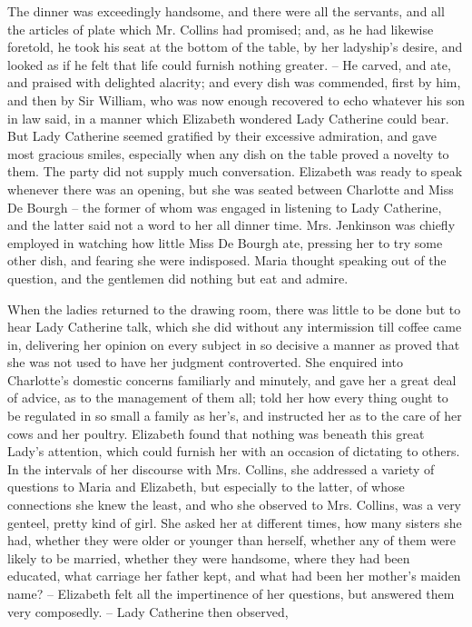 The dinner was exceedingly handsome, and there were
all the servants, and all the articles of plate which Mr.
Collins had promised; and, as he had likewise foretold,
he took his seat at the bottom of the table, by her ladyship’s
desire, and looked as if he felt that life could furnish
nothing greater. -- He carved, and ate, and praised with
delighted alacrity; and every dish was commended, first
by him, and then by Sir William, who was now enough
recovered to echo whatever his son in law said, in a manner
which Elizabeth wondered Lady Catherine could bear.
But Lady Catherine seemed gratified by their excessive
admiration, and gave most gracious smiles, especially when
any dish on the table proved a novelty to them. The
party did not supply much conversation. Elizabeth was
ready to speak whenever there was an opening, but she
was seated between Charlotte and Miss De Bourgh -- the
former of whom was engaged in listening to Lady Catherine,
and the latter said not a word to her all dinner time.
Mrs. Jenkinson was chiefly employed in watching how
little Miss De Bourgh ate, pressing her to try some other
dish, and fearing she were indisposed. Maria thought
speaking out of the question, and the gentlemen did
nothing but eat and admire.

When the ladies returned to the drawing room, there
was little to be done but to hear Lady Catherine talk,
which she did without any intermission till coffee came
in, delivering her opinion on every subject in so decisive
a manner as proved that she was not used to have her
judgment controverted. She enquired into Charlotte’s
domestic concerns familiarly and minutely, and gave her
a great deal of advice, as to the management of them all;
told her how every thing ought to be regulated in so
small a family as her’s, and instructed her as to the care
of her cows and her poultry. Elizabeth found that
nothing was beneath this great Lady’s attention, which
could furnish her with an occasion of dictating to others.
In the intervals of her discourse with Mrs. Collins, she
addressed a variety of questions to Maria and Elizabeth,
but especially to the latter, of whose connections she knew
the least, and who she observed to Mrs. Collins, was a very
genteel, pretty kind of girl. She asked her at different
times, how many sisters she had, whether they were older
or younger than herself, whether any of them were likely
to be married, whether they were handsome, where they
had been educated, what carriage her father kept, and what
had been her mother’s maiden name? -- Elizabeth felt all
the impertinence of her questions, but answered them very
composedly. -- Lady Catherine then observed,

